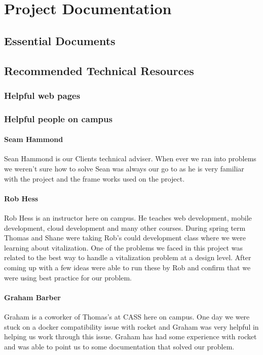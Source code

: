 \documentclass[onecolumn, draftclsnofoot,10pt, compsoc]{article}
\begin{document}
\section{Project Documentation}
    \subsection{Essential Documents}
    
    
    \subsection{Recommended Technical Resources}
        \subsubsection{Helpful web pages}
    
        \subsubsection{Helpful people on campus}
            \paragraph{Seam Hammond} Sean Hammond is our Clients technical adviser. When ever we ran into problems we weren't sure how to solve Sean was always our go to as he is very familiar with the project and the frame works used on the project.\\
            
            \paragraph{Rob Hess} Rob Hess is an instructor here on campus. He teaches web development, mobile development, cloud development and many other courses. During spring term Thomas and Shane were taking Rob's could development class where we were learning about vitalization. One of the problems we faced in this project was related to the best way to handle a vitalization problem at a design level. After coming up with a few ideas were able to run these by Rob and confirm that we were  using best practice for our problem.\\
            
            \paragraph{Graham Barber} Graham is a coworker of Thomas's at CASS here on campus. One day we were stuck on a docker compatibility issue with rocket and Graham was very helpful in helping us work through this issue. Graham has had some experience with rocket and was able to point us to some documentation that solved our problem.
            
\end{document}
